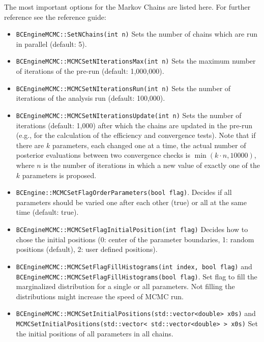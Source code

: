 \documentclass[11pt, a4paper]{article}
\begin{document}
The most important options for the Markov Chains are listed here. For
further reference see the reference guide:
%
\begin{itemize}

\item \verb|BCEngineMCMC::SetNChains(int n)| Sets the number of chains
  which are run in parallel (default: 5).

\item \verb|BCEngineMCMC::MCMCSetNIterationsMax(int n)| Sets the maximum
  number of iterations of the pre-run (default: 1,000,000).

\item \verb|BCEngineMCMC::MCMCSetNIterationsRun(int n)| Sets the number of
  iterations of the analysis run (default: 100,000).

\item \verb|BCEngineMCMC::MCMCSetNIterationsUpdate(int n)| Sets the number
  of iterations (default: 1,000) after which the chains are updated in
  the pre-run (e.g., for the calculation of the efficiency and
  convergence tests). Note that if there are $k$ parameters, each changed one
  at a time, the actual number of posterior evaluations between
  two convergence checks is $\min \left(k \cdot n, 10000\right)$, where $n$ is the number of iterations in
  which a new value of exactly one of the $k$ parameters is proposed.

\item \verb|BCEngine::MCMCSetFlagOrderParameters(bool flag)|. Decides
  if all parameters should be varied one after each other (true) or
  all at the same time (default: true).

\item \verb|BCEngineMCMC::MCMCSetFlagInitialPosition(int flag)| Decides how
  to chose the initial positions (0: center of the parameter
  boundaries, 1: random positions (default), 2: user defined
  positions).

\item \verb|BCEngineMCMC::MCMCSetFlagFillHistograms(int index, bool flag)| and \\
  \verb|BCEngineMCMC::MCMCSetFlagFillHistograms(bool flag)|. Set flag to fill the marginalized distribution for a single or all parameters. Not filling the distributions might increase the speed of MCMC run.

\item \verb|BCEngineMCMC::MCMCSetInitialPositions(std::vector<double> x0s)|
  and \\
  \verb|MCMCSetInitialPositions(std::vector< std::vector<double> > x0s)|
  Set the initial positions of all parameters in all chains.


\end{itemize}
\end{document}
